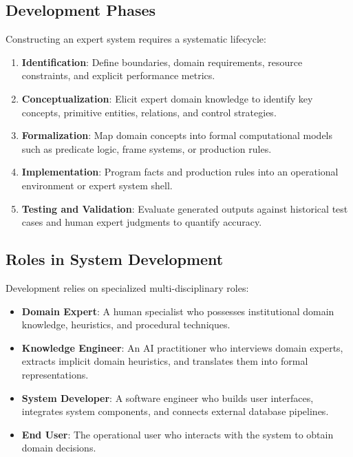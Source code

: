 \documentclass[12pt]{report}
\begin{document}
\subsection{Development Phases}

Constructing an expert system requires a systematic lifecycle:

\begin{enumerate}
    \item \textbf{Identification}: Define boundaries, domain requirements, resource constraints, and explicit performance metrics.
    \item \textbf{Conceptualization}: Elicit expert domain knowledge to identify key concepts, primitive entities, relations, and control strategies.
    \item \textbf{Formalization}: Map domain concepts into formal computational models such as predicate logic, frame systems, or production rules.
    \item \textbf{Implementation}: Program facts and production rules into an operational environment or expert system shell.
    \item \textbf{Testing and Validation}: Evaluate generated outputs against historical test cases and human expert judgments to quantify accuracy.
\end{enumerate}

\subsection{Roles in System Development}

Development relies on specialized multi-disciplinary roles:

\begin{itemize}
    \item \textbf{Domain Expert}: A human specialist who possesses institutional domain knowledge, heuristics, and procedural techniques.
    \item \textbf{Knowledge Engineer}: An AI practitioner who interviews domain experts, extracts implicit domain heuristics, and translates them into formal representations.
    \item \textbf{System Developer}: A software engineer who builds user interfaces, integrates system components, and connects external database pipelines.
    \item \textbf{End User}: The operational user who interacts with the system to obtain domain decisions.
\end{itemize}
\end{document}
